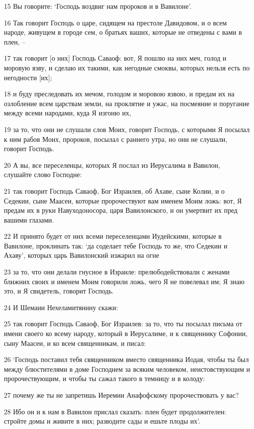 \par 15 Вы говорите: `Господь воздвиг нам пророков и в Вавилоне'.
\par 16 Так говорит Господь о царе, сидящем на престоле Давидовом, и о всем народе, живущем в городе сем, о братьях ваших, которые не отведены с вами в плен, --
\par 17 так говорит [о них] Господь Саваоф: вот, Я пошлю на них меч, голод и моровую язву, и сделаю их такими, как негодные смоквы, которых нельзя есть по негодности [их];
\par 18 и буду преследовать их мечом, голодом и моровою язвою, и предам их на озлобление всем царствам земли, на проклятие и ужас, на посмеяние и поругание между всеми народами, куда Я изгоню их,
\par 19 за то, что они не слушали слов Моих, говорит Господь, с которыми Я посылал к ним рабов Моих, пророков, посылал с раннего утра, но они не слушали, говорит Господь.
\par 20 А вы, все переселенцы, которых Я послал из Иерусалима в Вавилон, слушайте слово Господне:
\par 21 так говорит Господь Саваоф, Бог Израилев, об Ахаве, сыне Колии, и о Седекии, сыне Маасеи, которые пророчествуют вам именем Моим ложь: вот, Я предам их в руки Навуходоносора, царя Вавилонского, и он умертвит их пред вашими глазами.
\par 22 И принято будет от них всеми переселенцами Иудейскими, которые в Вавилоне, проклинать так: `да соделает тебе Господь то же, что Седекии и Ахаву', которых царь Вавилонский изжарил на огне
\par 23 за то, что они делали гнусное в Израиле: прелюбодействовали с женами ближних своих и именем Моим говорили ложь, чего Я не повелевал им; Я знаю это, и Я свидетель, говорит Господь.
\par 24 И Шемаии Нехеламитянину скажи:
\par 25 так говорит Господь Саваоф, Бог Израилев: за то, что ты посылал письма от имени своего ко всему народу, который в Иерусалиме, и к священнику Софонии, сыну Маасеи, и ко всем священникам, и писал:
\par 26 `Господь поставил тебя священником вместо священника Иодая, чтобы ты был между блюстителями в доме Господнем за всяким человеком, неистовствующим и пророчествующим, и чтобы ты сажал такого в темницу и в колоду:
\par 27 почему же ты не запретишь Иеремии Анафофскому пророчествовать у вас?
\par 28 Ибо он и к нам в Вавилон прислал сказать: плен будет продолжителен: стройте домы и живите в них; разводите сады и ешьте плоды их'.
